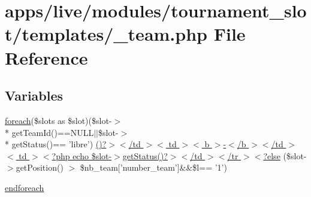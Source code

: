 \hypertarget{live_2modules_2tournament__slot_2templates_2__team_8php}{\section{apps/live/modules/tournament\-\_\-slot/templates/\-\_\-team.php File Reference}
\label{live_2modules_2tournament__slot_2templates_2__team_8php}
}
\subsection*{Variables}
\begin{DoxyCompactItemize}
\item 
\hyperlink{presse_2modules_2news_2templates_2index_success_8php_abc56db52b2e9a59bcd5c9e45ac5cb332}{foreach}(\$slots as \$slot)(\$slot-\/$>$\\*
get\-Team\-Id()==N\-U\-L\-L$|$$|$\$slot-\/$>$\\*
get\-Status()== 'libre') \hyperlink{live_2modules_2tournament__slot_2templates_2__team_8php_a41db4077e4532600ef87c5ace595e31f}{()?$>$$<$/td $>$$<$ td $>$$<$ b $>$-\/$<$/b $>$$<$/td $>$$<$ td $>$$<$?php echo \$slot-\/$>$get\-Status()?$>$$<$/td $>$$<$/tr $>$$<$?else} (\$slot-\/$>$get\-Position() $>$ \$nb\-\_\-team\mbox{[}'number\-\_\-team'\mbox{]}\&\&\$l== '1')
\item 
\hyperlink{live_2modules_2tournament__slot_2templates_2__team_8php_a672d9707ef91db026c210f98cc601123}{endforeach}
\end{DoxyCompactItemize}



